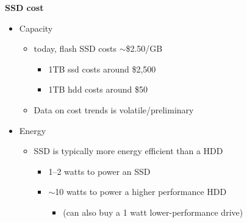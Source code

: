 \documentclass[11pt,a4paper]{article}
\begin{document}
\textbf{SSD cost}
\begin{itemize}
    \item Capacity
        \begin{itemize}
            \item today, flash SSD costs $\sim$\$2.50/GB
                \begin{itemize}
                    \item 1TB ssd costs around \$2,500
                    \item 1TB hdd costs around \$50
                \end{itemize}
            \item Data on cost trends is volatile/preliminary
        \end{itemize}
    \item Energy
        \begin{itemize}
            \item  SSD is typically more energy efficient than a HDD
                \begin{itemize}
                    \item 1--2 watts to power an SSD
                    \item $\sim$10 watts to power a higher performance HDD
                        \begin{itemize}
                            \item (can also buy a 1 watt lower-performance drive)
                        \end{itemize}
                \end{itemize}
        \end{itemize}
\end{itemize}
\end{document}
